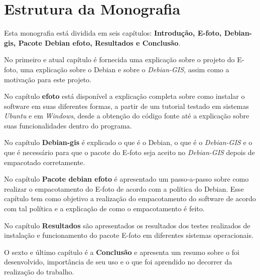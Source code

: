 \section*{Estrutura da Monografia}

Esta monografia está dividida em seis capítulos: \textbf{Introdução, E-foto, Debian-gis, Pacote Debian efoto, Resultados e Conclusão}.

No primeiro e atual capítulo é fornecida uma explicação sobre o projeto do E-foto, uma explicação sobre o Debian e sobre o \textit{Debian-GIS}, assim como a motivação para este projeto.

No capítulo \textbf{efoto} está disponível a explicação completa sobre como instalar o software em suas diferentes formas, a partir de um tutorial testado em sistemas \textit{Ubuntu} e em \textit{Windows}, desde a obtenção do código fonte até a explicação sobre suas funcionalidades dentro do programa.

No capítulo \textbf{Debian-gis} é explicado o que é o Debian, o que é o \textit{Debian-GIS} e o que é necessário para que o pacote do E-foto seja aceito no \textit{Debian-GIS} depois de empacotado corretamente.

No capítulo \textbf{Pacote debian efoto} é apresentado um passo-a-passo sobre como realizar o empacotamento do E-foto de acordo com a política do Debian. Esse capítulo tem como objetivo a realização do empacotamento do software de acordo com tal política e a explicação de como o empacotamento é feito.

No capítulo \textbf{Resultados} são apresentados os resultados dos testes realizados de instalação e funcionamento do pacote E-foto em diferentes sistemas operacionais.

O sexto e último capítulo é a \textbf{Conclusão} e apresenta um resumo sobre o foi desenvolvido, importância de seu uso e o que foi aprendido no decorrer da realização do trabalho.
